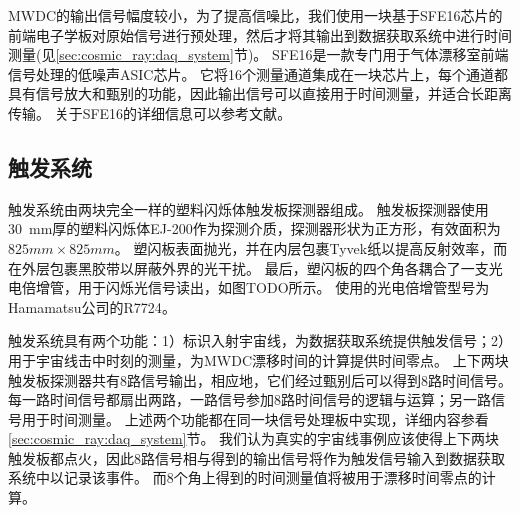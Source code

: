 MWDC的输出信号幅度较小，为了提高信噪比，我们使用一块基于SFE16芯片的前端电子学板对原始信号进行预处理，然后才将其输出到数据获取系统中进行时间测量(见\ref{sec:cosmic_ray:daq_system}节)。
SFE16是一款专门用于气体漂移室前端信号处理的低噪声ASIC芯片。
它将16个测量通道集成在一块芯片上，每个通道都具有信号放大和甄别的功能，因此输出信号可以直接用于时间测量，并适合长距离传输。
关于SFE16的详细信息可以参考文献\cite{sfe16}。

\subsection{触发系统}
\label{sec:cosmic_ray:triggering_system}
触发系统由两块完全一样的塑料闪烁体触发板探测器组成。
触发板探测器使用\SI{30}{mm}厚的塑料闪烁体EJ-200\cite{ej-200}作为探测介质，探测器形状为正方形，有效面积为$825mm \times 825mm$。
塑闪板表面抛光，并在内层包裹Tyvek纸以提高反射效率，而在外层包裹黑胶带以屏蔽外界的光干扰。
最后，塑闪板的四个角各耦合了一支光电倍增管，用于闪烁光信号读出，如图TODO所示。
使用的光电倍增管型号为Hamamatsu公司的R7724\cite{r7724}。

触发系统具有两个功能：1）标识入射宇宙线，为数据获取系统提供触发信号；2）用于宇宙线击中时刻的测量，为MWDC漂移时间的计算提供时间零点。
上下两块触发板探测器共有8路信号输出，相应地，它们经过甄别后可以得到8路时间信号。
每一路时间信号都扇出两路，一路信号参加8路时间信号的逻辑与运算；另一路信号用于时间测量。
上述两个功能都在同一块信号处理板中实现，详细内容参看\ref{sec:cosmic_ray:daq_system}节。
我们认为真实的宇宙线事例应该使得上下两块触发板都点火，因此8路信号相与得到的输出信号将作为触发信号输入到数据获取系统中以记录该事件。
而8个角上得到的时间测量值将被用于漂移时间零点的计算。


